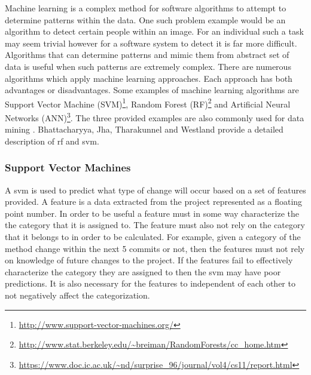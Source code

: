 Machine learning is a complex method for software algorithms to attempt to determine patterns within the data. %
One such problem example would be an algorithm to detect certain people within an image. For an individual such a task may seem trivial however for a software system to detect it is far more difficult. Algorithms that can determine patterns and mimic them from abstract set of data is useful when such patterns are extremely complex. There are numerous algorithms which apply machine learning approaches. Each approach has both advantages or disadvantages. Some examples of machine learning algorithms are Support Vector Machine (SVM)\footnote{\url{http://www.support-vector-machines.org/}}, Random Forest (RF)\footnote{\url{http://www.stat.berkeley.edu/~breiman/RandomForests/cc_home.htm}} and Artificial Neural Networks (ANN)\footnote{\url{https://www.doc.ic.ac.uk/~nd/surprise_96/journal/vol4/cs11/report.html}}. The three provided examples are also commonly used for data mining \cite{Alam2013, Westland2011, Granitto2007, Huang2007, Jalbert2012, Yu2011}. Bhattacharyya, Jha, Tharakunnel and Westland provide a detailed description of \gls{rf} and \gls{svm}\cite{Westland2011}.

\subsubsection{Support Vector Machines}
\label{subsec:svm_prediction}

A \gls{svm} is used to predict what type of change will occur based on a set of features provided. A feature is a data extracted from the project represented as a floating point number. In order to be useful a feature must in some way characterize the the category that it is assigned to. The feature must also not rely on the category that it belongs to in order to be calculated. For example, given a category of the method change within the next 5 commits or not, then the features must not rely on knowledge of future changes to the project. If the features fail to effectively characterize the category they are assigned to then the \gls{svm} may have poor predictions. It is also necessary for the features to independent of each other to not negatively affect the categorization.

